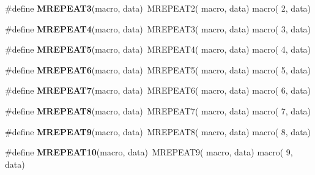 \begin{DoxyCompactItemize}
\item 
\hypertarget{group__group__xmega__utils__mrepeat_ga07e954bcdd0b8abbbe8a218540e503e3}{\#define {\bfseries M\-R\-E\-P\-E\-A\-T3}(macro, data)~M\-R\-E\-P\-E\-A\-T2(  macro, data)   macro(  2, data)}\label{group__group__xmega__utils__mrepeat_ga07e954bcdd0b8abbbe8a218540e503e3}

\item 
\hypertarget{group__group__xmega__utils__mrepeat_ga565fa75af0244153e43c1666192ef212}{\#define {\bfseries M\-R\-E\-P\-E\-A\-T4}(macro, data)~M\-R\-E\-P\-E\-A\-T3(  macro, data)   macro(  3, data)}\label{group__group__xmega__utils__mrepeat_ga565fa75af0244153e43c1666192ef212}

\item 
\hypertarget{group__group__xmega__utils__mrepeat_ga0961aba6bdaaed655d3f5c3855b06928}{\#define {\bfseries M\-R\-E\-P\-E\-A\-T5}(macro, data)~M\-R\-E\-P\-E\-A\-T4(  macro, data)   macro(  4, data)}\label{group__group__xmega__utils__mrepeat_ga0961aba6bdaaed655d3f5c3855b06928}

\item 
\hypertarget{group__group__xmega__utils__mrepeat_ga102c9b97712b4ad279ea3693ec4421e5}{\#define {\bfseries M\-R\-E\-P\-E\-A\-T6}(macro, data)~M\-R\-E\-P\-E\-A\-T5(  macro, data)   macro(  5, data)}\label{group__group__xmega__utils__mrepeat_ga102c9b97712b4ad279ea3693ec4421e5}

\item 
\hypertarget{group__group__xmega__utils__mrepeat_gacacd88e2ffdff7800bff4752a7d1b3af}{\#define {\bfseries M\-R\-E\-P\-E\-A\-T7}(macro, data)~M\-R\-E\-P\-E\-A\-T6(  macro, data)   macro(  6, data)}\label{group__group__xmega__utils__mrepeat_gacacd88e2ffdff7800bff4752a7d1b3af}

\item 
\hypertarget{group__group__xmega__utils__mrepeat_ga6681360ad4a3c108eb14310b7516b567}{\#define {\bfseries M\-R\-E\-P\-E\-A\-T8}(macro, data)~M\-R\-E\-P\-E\-A\-T7(  macro, data)   macro(  7, data)}\label{group__group__xmega__utils__mrepeat_ga6681360ad4a3c108eb14310b7516b567}

\item 
\hypertarget{group__group__xmega__utils__mrepeat_ga0b1d53ca9c8a88c0f50baca731190b2b}{\#define {\bfseries M\-R\-E\-P\-E\-A\-T9}(macro, data)~M\-R\-E\-P\-E\-A\-T8(  macro, data)   macro(  8, data)}\label{group__group__xmega__utils__mrepeat_ga0b1d53ca9c8a88c0f50baca731190b2b}

\item 
\hypertarget{group__group__xmega__utils__mrepeat_gade8cd92280a999cf105148e3fa4c5da9}{\#define {\bfseries M\-R\-E\-P\-E\-A\-T10}(macro, data)~M\-R\-E\-P\-E\-A\-T9(  macro, data)   macro(  9, data)}\label{group__group__xmega__utils__mrepeat_gade8cd92280a999cf105148e3fa4c5da9}


\end{DoxyCompactItemize}
